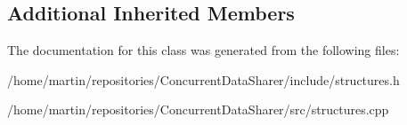 \subsection*{Additional Inherited Members}


The documentation for this class was generated from the following files\+:\begin{DoxyCompactItemize}
\item 
/home/martin/repositories/\+Concurrent\+Data\+Sharer/include/structures.\+h\item 
/home/martin/repositories/\+Concurrent\+Data\+Sharer/src/structures.\+cpp\end{DoxyCompactItemize}
